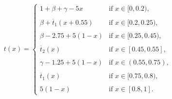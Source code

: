 \begin{example}
\begin{itemize}
\begin{itemize}
			\begin{equation}\label{eq:ExapleGenGen(v)}
				t(x)
				=
				\left\{ \begin{array}{ll}
					1 + \beta + \gamma -5x & \text{if } x \in [0,0.2), \\
					& \\
					\beta + \overline{t}_1(x+0.55) & \text{if } x \in [0.2,0.25),\\
					& \\
					\beta-2.75+5(1-x) & \text{if } x \in [0.25,0.45),\\
					& \\
					\overline{t}_2(x) & \text{if } x \in [0.45,0.55], \\
					& \\
					\gamma - 1.25 +5(1-x) & \text{if } x \in (0.55,0.75), \\
					& \\
					\overline{t}_1(x) & \text{if } x \in [0.75,0.8), \\
					& \\
					5(1-x) & \text{if } x \in [0.8,1].
				\end{array} \right.
			\end{equation}
			

\end{itemize}
\end{itemize}
\end{example}
